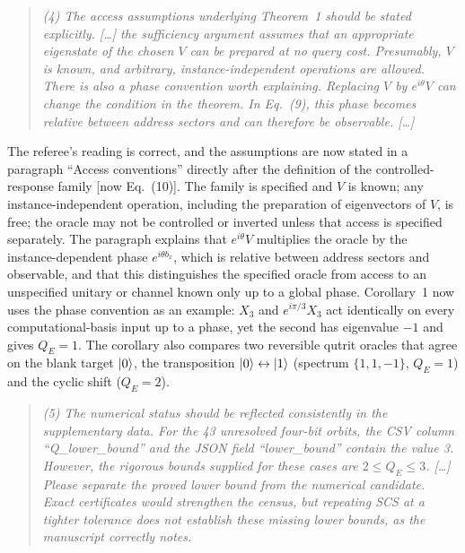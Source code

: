 \documentclass[11pt]{article}
\newenvironment{referee}{\begin{quote}\itshape}{\end{quote}}
\begin{document}
\begin{referee}
(4) The access assumptions underlying Theorem~1 should be stated explicitly.
[\dots] the sufficiency argument assumes that an appropriate eigenstate of the
chosen \(V\) can be prepared at no query cost. Presumably, \(V\) is known, and
arbitrary, instance-independent operations are allowed. There is also a phase
convention worth explaining. Replacing \(V\) by \(e^{i\theta}V\) can change the
condition in the theorem. In Eq.~(9), this phase becomes relative between
address sectors and can therefore be observable. [\dots]
\end{referee}

The referee's reading is correct, and the assumptions are now stated in a
paragraph ``Access conventions'' directly after the definition of the
controlled-response family [now Eq.~(10)]. The family is specified and \(V\) is
known; any instance-independent operation, including the preparation of
eigenvectors of \(V\), is free; the oracle may not be controlled or inverted
unless that access is specified separately. The paragraph explains that
\(e^{i\theta}V\) multiplies the oracle by the instance-dependent phase
\(e^{i\theta b_x}\), which is relative between address sectors and observable,
and that this distinguishes the specified oracle from access to an unspecified
unitary or channel known only up to a global phase. Corollary~1 now uses the
phase convention as an example: \(X_3\) and \(e^{i\pi/3}X_3\) act identically
on every computational-basis input up to a phase, yet the second has
eigenvalue \(-1\) and gives \(Q_E=1\). The corollary also compares two
reversible qutrit oracles that agree on the blank target \(\ket0\), the
transposition \(\ket0\leftrightarrow\ket1\) (spectrum \(\{1,1,-1\}\),
\(Q_E=1\)) and the cyclic shift (\(Q_E=2\)).

\begin{referee}
(5) The numerical status should be reflected consistently in the
supplementary data. For the 43 unresolved four-bit orbits, the CSV column
``Q\_lower\_bound'' and the JSON field ``lower\_bound'' contain the value 3.
However, the rigorous bounds supplied for these cases are \(2\le Q_E\le3\).
[\dots] Please separate the proved lower bound from the numerical candidate.
Exact certificates would strengthen the census, but repeating SCS at a tighter
tolerance does not establish these missing lower bounds, as the manuscript
correctly notes.
\end{referee}
\end{document}
